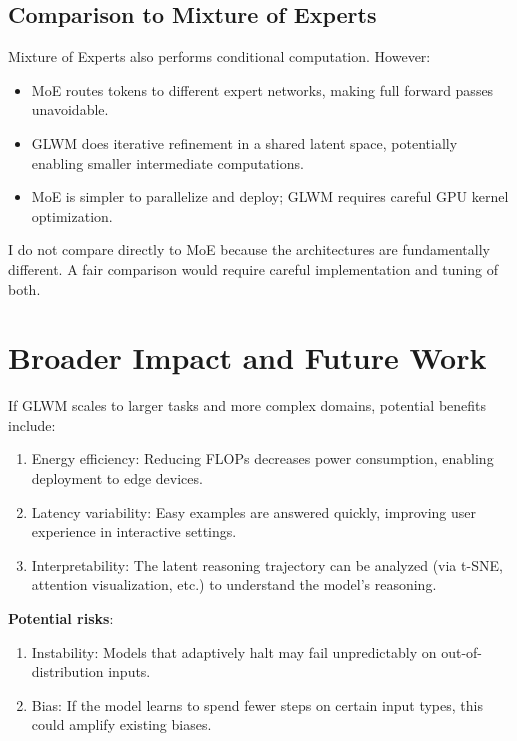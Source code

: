 \documentclass[11pt]{article}
\begin{document}
\subsection{Comparison to Mixture of Experts}

Mixture of Experts\cite{Shazeer2021} \cite{Lewis2022} also performs conditional computation. However:

\begin{itemize}
    \item MoE routes tokens to different expert networks, making full forward passes unavoidable.
    \item GLWM does iterative refinement in a shared latent space, potentially enabling smaller intermediate computations.
    \item MoE is simpler to parallelize and deploy; GLWM requires careful GPU kernel optimization.
\end{itemize}

I do not compare directly to MoE because the architectures are fundamentally different. A fair comparison would require careful implementation and tuning of both.

\section{Broader Impact and Future Work}

If GLWM scales to larger tasks and more complex domains, potential benefits include:

\begin{enumerate}
    \item Energy efficiency: Reducing FLOPs decreases power consumption, enabling deployment to edge devices.
    \item Latency variability: Easy examples are answered quickly, improving user experience in interactive settings.
    \item Interpretability: The latent reasoning trajectory can be analyzed (via t-SNE, attention visualization, etc.) to understand the model's reasoning.
\end{enumerate}

\textbf{Potential risks}:

\begin{enumerate}
    \item Instability: Models that adaptively halt may fail unpredictably on out-of-distribution inputs.
    \item Bias: If the model learns to spend fewer steps on certain input types, this could amplify existing biases.
\end{enumerate}
\end{document}
